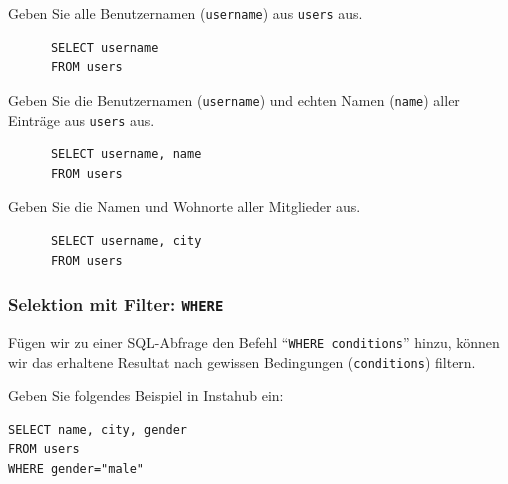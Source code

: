 \begin{myexercise}
  Geben Sie alle Benutzernamen (\texttt{username}) aus \texttt{users} aus.
  \begin{myanswer}
    \begin{lstlisting}
      SELECT username
      FROM users
      \end{lstlisting}
  \end{myanswer}
\end{myexercise}

\begin{myexercise}
  Geben Sie die Benutzernamen (\texttt{username}) und echten Namen (\texttt{name}) aller Einträge aus \texttt{users} aus.
  \begin{myanswer}
    \begin{lstlisting}
      SELECT username, name
      FROM users
    \end{lstlisting}
  \end{myanswer}
\end{myexercise}

\begin{myexercise}
  Geben Sie die Namen und Wohnorte aller Mitglieder aus.
  \begin{myanswer}
    \begin{lstlisting}
      SELECT username, city
      FROM users
    \end{lstlisting}
  \end{myanswer}
\end{myexercise}

\subsubsection*{Selektion mit Filter: \texorpdfstring{\lstinline|WHERE|}{WHERE}}
Fügen wir zu einer \gls{SQL}-Abfrage den Befehl \enquote{\lstinline|WHERE conditions|} hinzu, können wir das erhaltene Resultat nach gewissen Bedingungen (\texttt{conditions}) filtern.

\begin{myexample}
Geben Sie folgendes Beispiel in Instahub ein:

\begin{lstlisting}
SELECT name, city, gender
FROM users
WHERE gender="male"
\end{lstlisting}
\end{myexample}


